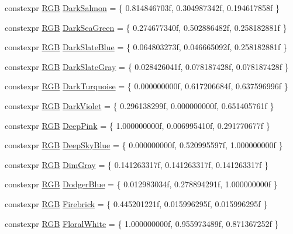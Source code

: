 \begin{DoxyCompactItemize}
constexpr \hyperlink{structmage_1_1_r_g_b}{R\+GB} \hyperlink{namespacemage_1_1color_ab179d9d88e39d4aab420b3b5c774b416}{Dark\+Salmon} = \{ 0.\+814846703f, 0.\+304987342f, 0.\+194617858f \}
\item 
constexpr \hyperlink{structmage_1_1_r_g_b}{R\+GB} \hyperlink{namespacemage_1_1color_a1e835bd8a981b6e1d26267e774b32c74}{Dark\+Sea\+Green} = \{ 0.\+274677340f, 0.\+502886482f, 0.\+258182881f \}
\item 
constexpr \hyperlink{structmage_1_1_r_g_b}{R\+GB} \hyperlink{namespacemage_1_1color_a5dad9107a42e3b57733617d884850bce}{Dark\+Slate\+Blue} = \{ 0.\+064803273f, 0.\+046665092f, 0.\+258182881f \}
\item 
constexpr \hyperlink{structmage_1_1_r_g_b}{R\+GB} \hyperlink{namespacemage_1_1color_ac2267d00e970246ed57ab091410f3d0b}{Dark\+Slate\+Gray} = \{ 0.\+028426041f, 0.\+078187428f, 0.\+078187428f \}
\item 
constexpr \hyperlink{structmage_1_1_r_g_b}{R\+GB} \hyperlink{namespacemage_1_1color_a4717affd7c87b2f89b9e461b16510f56}{Dark\+Turquoise} = \{ 0.\+000000000f, 0.\+617206684f, 0.\+637596996f \}
\item 
constexpr \hyperlink{structmage_1_1_r_g_b}{R\+GB} \hyperlink{namespacemage_1_1color_adb191fa4601ac336db967a8ec301370f}{Dark\+Violet} = \{ 0.\+296138299f, 0.\+000000000f, 0.\+651405761f \}
\item 
constexpr \hyperlink{structmage_1_1_r_g_b}{R\+GB} \hyperlink{namespacemage_1_1color_aa68a1c007257021aa438e5ad8251e0b1}{Deep\+Pink} = \{ 1.\+000000000f, 0.\+006995410f, 0.\+291770677f \}
\item 
constexpr \hyperlink{structmage_1_1_r_g_b}{R\+GB} \hyperlink{namespacemage_1_1color_a6a122d439d2206202dc3078cf8bb645f}{Deep\+Sky\+Blue} = \{ 0.\+000000000f, 0.\+520995597f, 1.\+000000000f \}
\item 
constexpr \hyperlink{structmage_1_1_r_g_b}{R\+GB} \hyperlink{namespacemage_1_1color_a74d9b984f9bc60a90b9d7eb6debce8ca}{Dim\+Gray} = \{ 0.\+141263317f, 0.\+141263317f, 0.\+141263317f \}
\item 
constexpr \hyperlink{structmage_1_1_r_g_b}{R\+GB} \hyperlink{namespacemage_1_1color_ad5375c3554ad1719cb3cb199ad0eb9ee}{Dodger\+Blue} = \{ 0.\+012983034f, 0.\+278894291f, 1.\+000000000f \}
\item 
constexpr \hyperlink{structmage_1_1_r_g_b}{R\+GB} \hyperlink{namespacemage_1_1color_add7b65bdb6d5f690222f8be205a5b028}{Firebrick} = \{ 0.\+445201221f, 0.\+015996295f, 0.\+015996295f \}
\item 
constexpr \hyperlink{structmage_1_1_r_g_b}{R\+GB} \hyperlink{namespacemage_1_1color_a1dd66768142140e9ee68a95e5981c44a}{Floral\+White} = \{ 1.\+000000000f, 0.\+955973489f, 0.\+871367252f \}

\end{DoxyCompactItemize}
